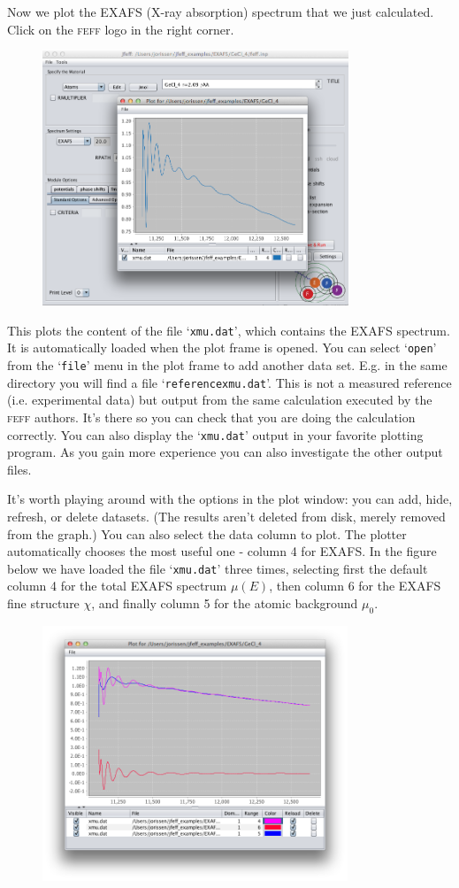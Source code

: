 \documentclass[11pt,oneside]{report} %
\newcommand{\program}[1]{\textsc{#1}}
\newcommand{\feff}{\program{feff}}
\newcommand{\file}[1]{`\texttt{#1}'}
\begin{document}
Now we plot the EXAFS (X-ray absorption) spectrum that we just calculated.  Click on the {\feff} logo in the right corner.
\begin{figure}[H]
	\centering
		\includegraphics[height=3.0in]{plot1.png}
	\label{fig:plot1}
\end{figure}


This plots the content of the file \file{xmu.dat}, which contains the EXAFS spectrum.  It is automatically loaded when the plot frame is opened. You can select \file{open} from the \file{file} menu in the plot frame to add another data set.  E.g. in the same directory you will find a file \file{referencexmu.dat}.  This is not a measured reference (i.e. experimental data) but output from the same calculation executed by the {\feff} authors.  It's there so you can check that you are doing the calculation correctly.  You can also display the \file{xmu.dat} output in your favorite plotting program.  As you gain more experience you can also investigate the other output files. 


It's worth playing around with the options in the plot window: you can add, hide, refresh, or delete datasets.  (The results aren't deleted from disk, merely removed from the graph.)  You can also select the data column to plot.  The plotter automatically chooses the most useful one - column 4 for EXAFS.  In the figure below we have loaded the file \file{xmu.dat} three times, selecting first the default column 4 for the total EXAFS spectrum $\mu(E)$, then column 6 for the EXAFS fine structure $\chi$, and finally column 5 for the atomic background $\mu_0$. 

\begin{figure}[H]
	\centering
		\includegraphics[height=3.0in]{plot2.png}
	\label{fig:plot2}
\end{figure}
\end{document}
